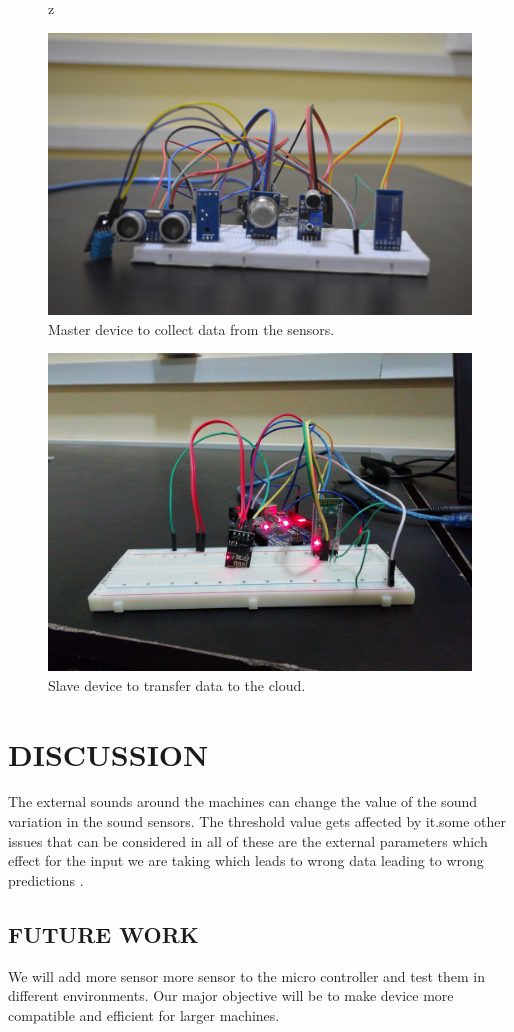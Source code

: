 \begin{figure}[h]
z\centerline{\includegraphics[width=4.7in]{master2}}
\caption{Master device to collect data from the sensors.}
\end{figure}
\vspace{0.3in}
\begin{figure}[h]
\centerline{\includegraphics[width=4.7in]{sl}}
\caption{Slave device to transfer data to the cloud.}
\end{figure}
\newpage



\newpage
\section{DISCUSSION}
The external sounds around the machines can change the value of the sound variation in the sound sensors. The threshold value gets affected by it.some other issues that can be considered in all of these are the external parameters which effect for the input we are taking which leads to wrong data leading to wrong predictions .\\
\subsection{FUTURE WORK}
We will add more sensor more sensor to the micro controller and test them in different environments. Our major objective will be to make device more compatible and efficient for larger machines. 